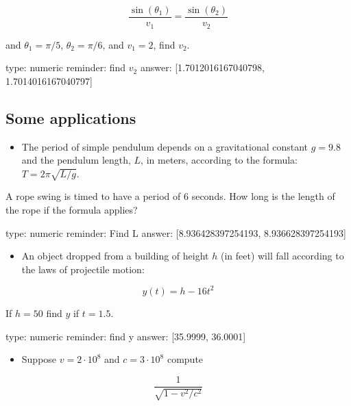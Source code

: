 \documentclass[12pt]{article}
\begin{document}
\[
\frac{\sin(\theta_1)}{v_1} = \frac{\sin(\theta_2)}{v_2}
\]

and $\theta_1 = \pi/5$, $\theta_2 = \pi/6$, and $v_1=2$, find $v_2$.

\begin{answer}
    type: numeric
    reminder: find \(v_2\)
    answer: [1.7012016167040798, 1.7014016167040797]

\end{answer}

\subsection{Some applications}

\begin{itemize}
\itemsep1pt\parskip0pt
\item
  The period of simple pendulum depends on a gravitational constant
  $g=9.8$ and the pendulum length, $L$, in meters, according to the
  formula: $T=2\pi\sqrt{L/g}$.
\end{itemize}

A rope swing is timed to have a period of $6$ seconds. How long is the
length of the rope if the formula applies?

\begin{answer}
    type: numeric
    reminder: Find L
    answer: [8.936428397254193, 8.936628397254193]

\end{answer}

\begin{itemize}
\itemsep1pt\parskip0pt
\item
  An object dropped from a building of height $h$ (in feet) will fall
  according to the laws of projectile motion:
\end{itemize}

\[
y(t) = h - 16t^2
\]

If $h=50$ find $y$ if $t=1.5$.

\begin{answer}
    type: numeric
    reminder: find y
    answer: [35.9999, 36.0001]

\end{answer}

\begin{itemize}
\itemsep1pt\parskip0pt
\item
  Suppose $v = 2\cdot 10^8$ and $c = 3 \cdot 10^8$ compute
\end{itemize}

\[
\frac{1}{\sqrt{1 - v^2/c^2}}
\]
\end{document}
